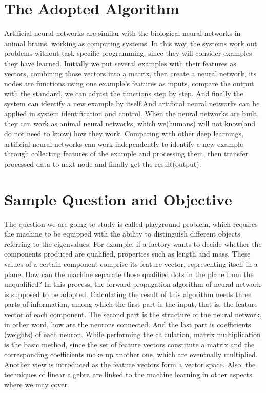 \documentclass{article}
\begin{document}
\begin{spacing}{2.0}
\section{The Adopted Algorithm}
Artificial neural networks are similar with the biological neural networks in animal brains, working as computing systems.\cite{bibtiem2} In this way, the systems work out problems without task-specific programming, since they will consider examples they have learned. Initially we put several examples with their features as vectors, combining those vectors into a matrix, then create a neural network, its nodes are functions using one example’s features as inputs, compare the output with the standard, we can adjust the functions step by step. And finally the system can identify a new example by itself.And artificial neural networks can be applied in system identification and control. When the neural networks are built, they can work as animal neural networks, which we(humans) will not know(and do not need to know) how they work. Comparing with other deep learnings, artificial neural networks can work independently to identify a new example through collecting features of the example and processing them, then transfer processed data to next node and finally get the result(output).

\section{Sample Question and Objective}
The question we are going to study is called playground problem, which requires the machine to be equipped with the ability to distinguish different objects referring to the eigenvalues. For example, if a factory wants to decide whether the components produced are qualified, properties such as length and mass. These values of a certain component comprise its feature vector, representing itself in a plane. How can the machine separate those qualified dots in the plane from the unqualified? 
In this process, the forward propagation algorithm of neural network is supposed to be adopted. Calculating the result of this algorithm needs three parts of information, among which the first part is the input, that is, the feature vector of each component. The second part is the structure of the neural network, in other word, how are the neurons connected. And the last part is coefficients (weights) of each neuron. While performing the calculation, matrix multiplication is the basic method, since the set of feature vectors constitute a matrix and the corresponding coefficients make up another one, which are eventually multiplied. Another view is introduced as the feature vectors form a vector space. Also, the techniques of linear algebra are linked to the machine learning in other aspects where we may cover.


\end{spacing}
\end{document}
